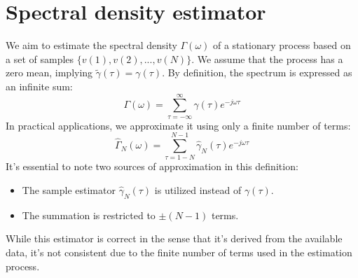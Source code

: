 \section{Spectral density estimator}

We aim to estimate the spectral density $\Gamma(\omega)$ of a stationary process based on a set of samples $\{v(1), v(2), ..., v(N)\}$. 
We assume that the process has a zero mean, implying $\tilde{\gamma}(\tau)=\gamma(\tau)$. 
By definition, the spectrum is expressed as an infinite sum:
\[\Gamma(\omega)=\sum_{\tau=-\infty}^{\infty}\gamma(\tau)e^{-j\omega\tau}\]
In practical applications, we approximate it using only a finite number of terms:
\[\hat{\Gamma}_N(\omega)=\sum_{\tau=1-N}^{N-1}\hat{\gamma}_N(\tau)e^{-j\omega\tau}\]
It's essential to note two sources of approximation in this definition:
\begin{itemize}
    \item The sample estimator $\hat{\gamma}_N(\tau)$ is utilized instead of $\gamma(\tau)$. 
    \item The summation is restricted to $\pm(N-1)$ terms.
\end{itemize}
While this estimator is correct in the sense that it's derived from the available data, it's not consistent due to the finite number of terms used in the estimation process.
